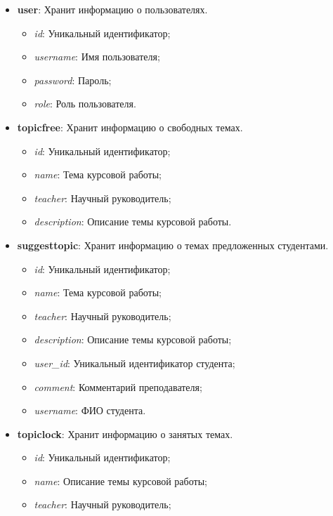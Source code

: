 \documentclass[14pt]{extarticle} %
\begin{document}
\begin{itemize}
    \item \textbf{user}: Хранит информацию о пользователях.
    \begin{itemize}
        \item \textit{id}: Уникальный идентификатор;
        \item \textit{username}: Имя пользователя;
        \item \textit{password}: Пароль;
        \item \textit{role}: Роль пользователя.
    \end{itemize}
    \item \textbf{topicfree}: Хранит информацию о свободных темах.
    \begin{itemize}
        \item \textit{id}: Уникальный идентификатор;
        \item \textit{name}: Тема курсовой работы;
        \item \textit{teacher}: Научный руководитель;
        \item \textit{description}: Описание темы курсовой работы.
    \end{itemize}
    \item \textbf{suggesttopic}: Хранит информацию о темах предложенных студентами.
    \begin{itemize}
        \item \textit{id}: Уникальный идентификатор;
        \item \textit{name}: Тема курсовой работы;
        \item \textit{teacher}: Научный руководитель;
        \item \textit{description}: Описание темы курсовой работы;
        \item \textit{user\_id}: Уникальный идентификатор студента;
        \item \textit{comment}: Комментарий преподавателя;
        \item \textit{username}: ФИО студента.
    \end{itemize}
    \item \textbf{topiclock}: Хранит информацию о занятых темах.
    \begin{itemize}
        \item \textit{id}: Уникальный идентификатор;
        \item \textit{name}: Описание темы курсовой работы;
        \item \textit{teacher}: Научный руководитель;

\end{itemize}
\end{itemize}
\end{document}
